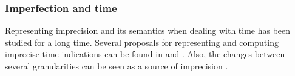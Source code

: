 	
	
	
	
	


\subsubsection{Imperfection and time}
Representing imprecision and its semantics when dealing with time has been studied for a long time. Several proposals for representing and computing imprecise time indications can be found in \cite{DeCaluwe1997} and \cite{DeTre1997}. Also, the changes between several granularities can be seen as a source of imprecision \cite{Devos1998}.

